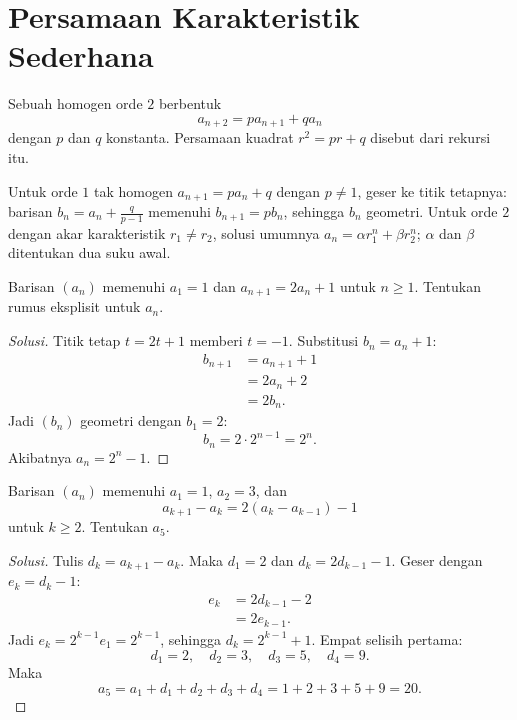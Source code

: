 \documentclass[12pt]{scrartcl}
\begin{document}
\section{Persamaan Karakteristik Sederhana}

\begin{definition}
Sebuah  homogen orde $2$ berbentuk
\[ a_{n+2} = p a_{n+1} + q a_n \]
dengan $p$ dan $q$ konstanta. Persamaan kuadrat $r^2 = pr + q$ disebut
 dari rekursi itu.
\end{definition}

\begin{fact}
Untuk orde $1$ tak homogen $a_{n+1} = p a_n + q$ dengan $p \ne 1$, geser ke
titik tetapnya: barisan $b_n = a_n + \frac{q}{p-1}$ memenuhi $b_{n+1} = p b_n$,
sehingga $b_n$ geometri. Untuk orde $2$ dengan akar karakteristik $r_1 \ne r_2$,
solusi umumnya $a_n = \alpha r_1^n + \beta r_2^n$; $\alpha$ dan $\beta$
ditentukan dua suku awal.
\end{fact}

\begin{example}
Barisan $(a_n)$ memenuhi $a_1 = 1$ dan $a_{n+1} = 2a_n + 1$ untuk $n \ge 1$.
Tentukan rumus eksplisit untuk $a_n$.
\end{example}
\begin{proof}[Solusi]
\renewcommand{\qedsymbol}{$\blacksquare$}
Titik tetap $t = 2t + 1$ memberi $t = -1$. Substitusi $b_n = a_n + 1$:
\begin{align*}
b_{n+1} &= a_{n+1} + 1 \\
&= 2a_n + 2 \\
&= 2b_n.
\end{align*}
Jadi $(b_n)$ geometri dengan $b_1 = 2$:
\[ b_n = 2 \cdot 2^{n-1} = 2^n. \]
Akibatnya $a_n = 2^n - 1$.
\end{proof}

\begin{example}
Barisan $(a_n)$ memenuhi $a_1 = 1$, $a_2 = 3$, dan
\[ a_{k+1} - a_k = 2(a_k - a_{k-1}) - 1 \]
untuk $k \ge 2$. Tentukan $a_5$.
\end{example}
\begin{proof}[Solusi]
\renewcommand{\qedsymbol}{$\blacksquare$}
Tulis $d_k = a_{k+1} - a_k$. Maka $d_1 = 2$ dan $d_k = 2d_{k-1} - 1$.
Geser dengan $e_k = d_k - 1$:
\begin{align*}
e_k &= 2d_{k-1} - 2 \\
&= 2e_{k-1}.
\end{align*}
Jadi $e_k = 2^{k-1} e_1 = 2^{k-1}$, sehingga $d_k = 2^{k-1} + 1$.
Empat selisih pertama:
\[ d_1 = 2, \quad d_2 = 3, \quad d_3 = 5, \quad d_4 = 9. \]
Maka
\[ a_5 = a_1 + d_1 + d_2 + d_3 + d_4 = 1 + 2 + 3 + 5 + 9 = 20. \]
\end{proof}
\end{document}
